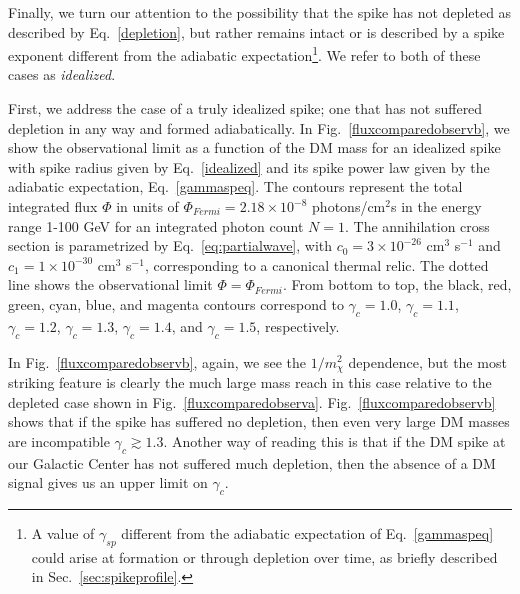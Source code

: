 \documentclass[11pt]{article}
\begin{document}
Finally, we turn our attention to the possibility that the spike has not depleted as described by Eq.~\ref{depletion}, but rather remains intact or is described by a spike exponent different from the adiabatic expectation\footnote{A value of $\gamma_{sp}$ different from the adiabatic expectation of Eq.~\ref{gammaspeq} could arise at formation or through depletion over time, as briefly described in Sec.~\ref{sec:spikeprofile}.}.  We refer to both of these cases as {\it idealized}.

First, we address the case of a truly idealized spike; one that has not suffered depletion in any way and formed adiabatically.
In Fig.~\ref{fluxcomparedobservb}, we show the observational limit as a function of the DM mass for an idealized spike with spike radius given by Eq.~\ref{idealized} and its spike power law given by the adiabatic expectation, Eq.~\ref{gammaspeq}. The contours represent the total integrated flux $\Phi$ in units of  $ \Phi_{Fermi} = 2.18 \times 10^{-8}$ photons/cm$^2$s in the energy range 1-100 GeV for an integrated photon count $N=1$. The annihilation cross section is parametrized by Eq.~\ref{eq:partialwave}, with $c_0 = 3 \times 10^{-26}$ cm$^{3}$ s$^{-1}$ and $c_1 = 1 \times 10^{-30}$ cm$^{3}$ s$^{-1}$, corresponding to a canonical thermal relic. The dotted line shows the observational limit $\Phi = \Phi_{Fermi}$.  From bottom to top, the  black, red, green, cyan, blue, and magenta contours correspond to $\gamma_c = 1.0$, $\gamma_c = 1.1$, $\gamma_c = 1.2$, $\gamma_c = 1.3$,  $\gamma_c = 1.4$, and  $\gamma_c = 1.5$, respectively.

In Fig.~\ref{fluxcomparedobservb}, again, we see the $1/m_\chi^2$ dependence, but the most striking feature is clearly the much large mass reach in this case relative to the depleted case shown in Fig.~\ref{fluxcomparedobserva}.  Fig.~\ref{fluxcomparedobservb} shows that if the spike has suffered no depletion, then even very large DM masses are incompatible $\gamma_c \gtrsim 1.3$. Another way of reading this is that if the DM spike at our Galactic Center has not suffered much depletion, then the absence of a DM signal gives us an upper limit on $\gamma_c$.
\end{document}
